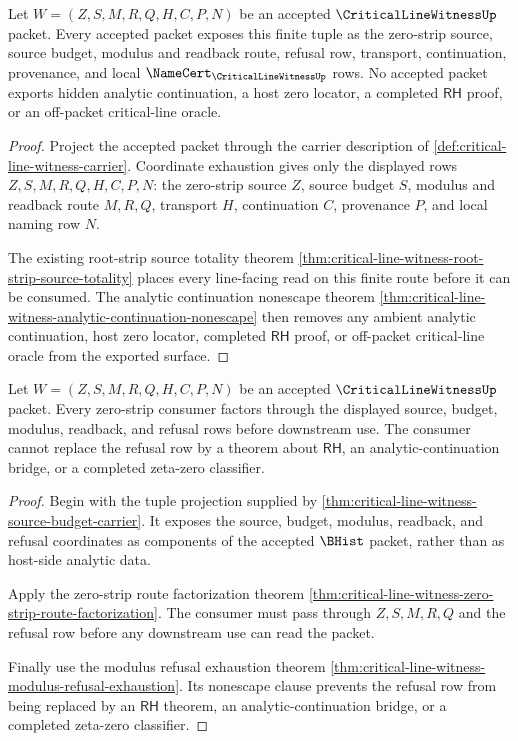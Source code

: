 \begin{theorem}
\label{thm:critical-line-witness-source-budget-carrier}
Let $W=(Z,S,M,R,Q,H,C,P,N)$ be an accepted $\CriticalLineWitnessUp$ packet.
Every accepted packet exposes this finite tuple as the zero-strip source,
source budget, modulus and readback route, refusal row, transport,
continuation, provenance, and local $\NameCert_{\CriticalLineWitnessUp}$
rows. No accepted packet exports hidden analytic continuation, a host zero
locator, a completed $\mathsf{RH}$ proof, or an off-packet critical-line
oracle.
\end{theorem}
\begin{proof}
Project the accepted packet through the carrier description of
\autoref{def:critical-line-witness-carrier}. Coordinate exhaustion gives only
the displayed rows $Z,S,M,R,Q,H,C,P,N$: the zero-strip source $Z$, source
budget $S$, modulus and readback route $M,R,Q$, transport $H$, continuation
$C$, provenance $P$, and local naming row $N$.

The existing root-strip source totality theorem
\autoref{thm:critical-line-witness-root-strip-source-totality} places every
line-facing read on this finite route before it can be consumed. The analytic
continuation nonescape theorem
\autoref{thm:critical-line-witness-analytic-continuation-nonescape} then
removes any ambient analytic continuation, host zero locator, completed
$\mathsf{RH}$ proof, or off-packet critical-line oracle from the exported
surface.
\end{proof}

\begin{theorem}
\label{thm:critical-line-witness-zero-strip-refusal}
Let $W=(Z,S,M,R,Q,H,C,P,N)$ be an accepted $\CriticalLineWitnessUp$ packet.
Every zero-strip consumer factors through the displayed source, budget,
modulus, readback, and refusal rows before downstream use. The consumer cannot
replace the refusal row by a theorem about $\mathsf{RH}$, an
analytic-continuation bridge, or a completed zeta-zero classifier.
\end{theorem}
\begin{proof}
Begin with the tuple projection supplied by
\autoref{thm:critical-line-witness-source-budget-carrier}. It exposes the
source, budget, modulus, readback, and refusal coordinates as components of
the accepted $\BHist$ packet, rather than as host-side analytic data.

Apply the zero-strip route factorization theorem
\autoref{thm:critical-line-witness-zero-strip-route-factorization}. The
consumer must pass through $Z,S,M,R,Q$ and the refusal row before any
downstream use can read the packet.

Finally use the modulus refusal exhaustion theorem
\autoref{thm:critical-line-witness-modulus-refusal-exhaustion}. Its
nonescape clause prevents the refusal row from being replaced by an
$\mathsf{RH}$ theorem, an analytic-continuation bridge, or a completed
zeta-zero classifier.
\end{proof}

